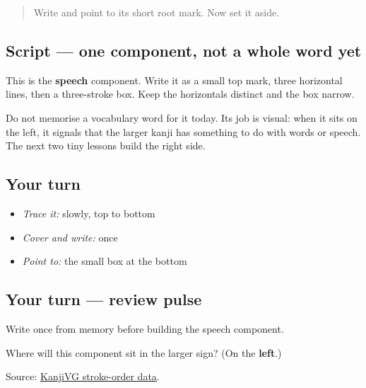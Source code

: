 \label{lesson:JA-W05-gen-component}



\begin{quote}
Write  and point to its short root mark. Now set it aside.
\end{quote}

\subsection*{Script — one component, not a whole word yet}

\begin{quote}
\end{quote}

This is the \textbf{speech} component. Write it as a small top mark, three horizontal lines, then a three-stroke box. Keep the horizontals distinct and the box narrow.

Do not memorise a vocabulary word for it today. Its job is visual: when it sits on the left, it signals that the larger kanji has something to do with words or speech. The next two tiny lessons build the right side.

\subsection*{Your turn}
\begin{itemize}
\raggedright
  \item \emph{Trace it:}  slowly, top to bottom
  \item \emph{Cover and write:}  once
  \item \emph{Point to:} the small box at the bottom
\end{itemize}

\subsection*{Your turn — review pulse}
Write \textbf{} once from memory before building the speech component.

\begin{tcolorbox}[breakable,colback=teal!4,colframe=teal!35!black,title={Before you move on}]
Where will this component sit in the larger sign? (On the \textbf{left}.)

Source: \href{https://kanjivg.tagaini.net/kanjivg/kanji/08a00.html}{KanjiVG stroke-order data}.
\end{tcolorbox}
